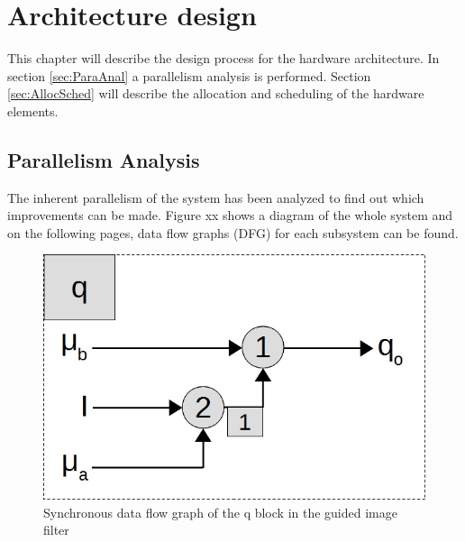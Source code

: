 \chapter{Architecture design} \label{ch:archdesign}
This chapter will describe the design process for the hardware architecture. In section \ref{sec:ParaAnal} a parallelism analysis is performed. Section \ref{sec:AllocSched} will describe the allocation and scheduling of the hardware elements.

\section{Parallelism Analysis}\label{sec:paraanal}
The inherent parallelism of the system has been analyzed to find out which improvements can be made. Figure xx shows a diagram of the whole system and on the following pages, data flow graphs (DFG) for each subsystem can be found. \\

\begin{figure}[ht!]
  \centering
  \includegraphics[scale=0.3]{figures/SDFG_q}
  \caption{Synchronous data flow graph of the q block in the guided image filter}
  \label{fig:sdfg_q}
\end{figure}

